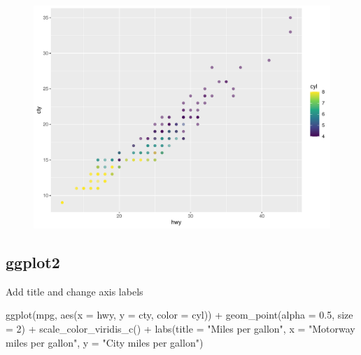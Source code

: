 \documentclass[
  letterpaper,
  DIV=11,
  numbers=noendperiod,
  landscape]{scrartcl}
\newenvironment{Shaded}{\begin{snugshade}}{\end{snugshade}}
\newcommand{\AttributeTok}[1]{\textcolor[rgb]{0.40,0.45,0.13}{#1}}
\newcommand{\DecValTok}[1]{\textcolor[rgb]{0.68,0.00,0.00}{#1}}
\newcommand{\FloatTok}[1]{\textcolor[rgb]{0.68,0.00,0.00}{#1}}
\newcommand{\FunctionTok}[1]{\textcolor[rgb]{0.28,0.35,0.67}{#1}}
\newcommand{\NormalTok}[1]{\textcolor[rgb]{0.00,0.23,0.31}{#1}}
\newcommand{\SpecialCharTok}[1]{\textcolor[rgb]{0.37,0.37,0.37}{#1}}
\newcommand{\StringTok}[1]{\textcolor[rgb]{0.13,0.47,0.30}{#1}}
\begin{document}
\begin{figure}[H]

{\centering \includegraphics{RandRStudio_files/figure-pdf/unnamed-chunk-15-1.pdf}

}

\end{figure}

\hypertarget{ggplot2-5}{%
\subsection{ggplot2}\label{ggplot2-5}}

Add title and change axis labels

\begin{Shaded}
\begin{Highlighting}[numbers=left,,]
\FunctionTok{ggplot}\NormalTok{(mpg, }\FunctionTok{aes}\NormalTok{(}\AttributeTok{x =}\NormalTok{ hwy, }\AttributeTok{y =}\NormalTok{ cty, }\AttributeTok{color =}\NormalTok{ cyl)) }\SpecialCharTok{+}
  \FunctionTok{geom\_point}\NormalTok{(}\AttributeTok{alpha =} \FloatTok{0.5}\NormalTok{, }\AttributeTok{size =} \DecValTok{2}\NormalTok{)  }\SpecialCharTok{+}
  \FunctionTok{scale\_color\_viridis\_c}\NormalTok{() }\SpecialCharTok{+}
  \FunctionTok{labs}\NormalTok{(}\AttributeTok{title =} \StringTok{"Miles per gallon"}\NormalTok{,}
       \AttributeTok{x =} \StringTok{"Motorway miles per gallon"}\NormalTok{,}
       \AttributeTok{y =} \StringTok{"City miles per gallon"}\NormalTok{)}
\end{Highlighting}
\end{Shaded}
\end{document}
